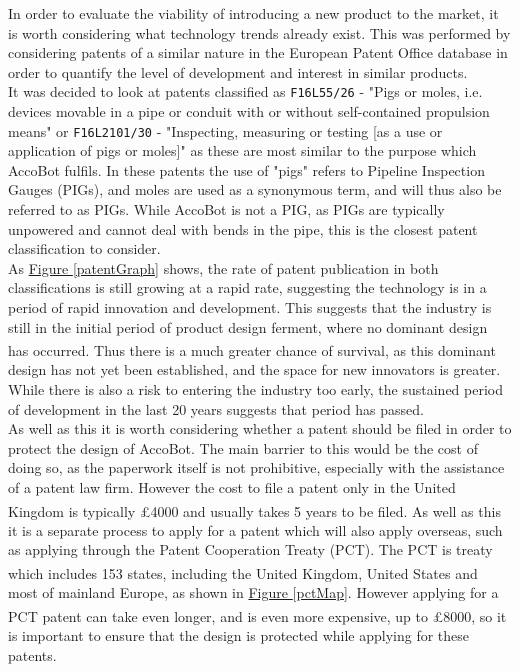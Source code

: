 \documentclass[11pt]{article}		%
\newcommand{\supercite}[1]{\textsuperscript{\cite{#1}}}		%
\newcommand{\figref}[1]{\hyperref[#1]{Figure \ref*{#1}}}    %
\begin{document}
        In order to evaluate the viability of introducing a new product to the market, it is worth considering what technology trends already exist.
        This was performed by considering patents of a similar nature in the European Patent Office database in order to quantify the level of development and interest in similar products.
        \\
		It was decided to look at patents classified as \verb|F16L55/26| - "Pigs or moles, i.e. devices movable in a pipe or conduit with or without self-contained propulsion means" or \verb|F16L2101/30| - "Inspecting, measuring or testing [as a use or application of pigs or moles]" as these are most similar to the purpose which AccoBot fulfils.
		In these patents the use of "pigs" refers to Pipeline Inspection Gauges (PIGs), and moles are used as a synonymous term, and will thus also be referred to as PIGs.
		While AccoBot is not a PIG, as PIGs are typically unpowered and cannot deal with bends in the pipe, this is the closest patent classification to consider.
		\\
		As \figref{patentGraph} shows, the rate of patent publication in both classifications is still growing at a rapid rate, suggesting the technology is in a period of rapid innovation and development.
		This suggests that the industry is still in the initial period of product design ferment, where no dominant design has occurred\supercite{christensen1998innovation}.
		Thus there is a much greater chance of survival, as this dominant design has not yet been established, and the space for new innovators is greater.
		While there is also a risk to entering the industry too early, the sustained period of development in the last 20 years suggests that period has passed.
		\\
		As well as this it is worth considering whether a patent should be filed in order to protect the design of AccoBot.
		The main barrier to this would be the cost of doing so, as the paperwork itself is not prohibitive, especially with the assistance of a patent law firm.
		However the cost to file a patent only in the United Kingdom is typically £4000 and usually takes 5 years to be filed\supercite{uk2020patenting}.
		As well as this it is a separate process to apply for a patent which will also apply overseas, such as applying through the Patent Cooperation Treaty (PCT).
		The PCT is treaty which includes 153 states\supercite{pct2020states}, including the United Kingdom, United States and most of mainland Europe, as shown in \figref{pctMap}.
		However applying for a PCT patent can take even longer, and is even more expensive, up to £8000\supercite{mewburn2020international}, so it is important to ensure that the design is protected while applying for these patents.
\end{document}
